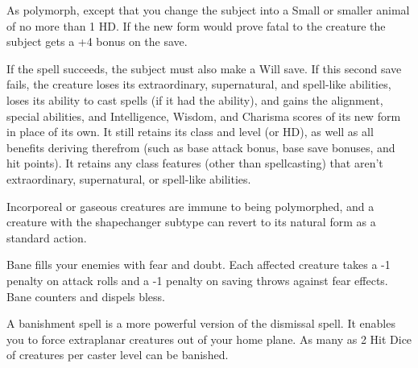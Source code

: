\begin{multicols}{2}
\begin{small}

\noindent As polymorph, except that you change the subject into a Small or smaller animal of no more than 1 HD. If the new form would prove fatal to the creature the subject gets a +4 bonus on the save.

\smallskip\noindent If the spell succeeds, the subject must also make a Will save. If this second save fails, the creature loses its extraordinary, supernatural, and spell-like abilities, loses its ability to cast spells (if it had the ability), and gains the alignment, special abilities, and Intelligence, Wisdom, and Charisma scores of its new form in place of its own. It still retains its class and level (or HD), as well as all benefits deriving therefrom (such as base attack bonus, base save bonuses, and hit points). It retains any class features (other than spellcasting) that aren't extraordinary, supernatural, or spell-like abilities.

\smallskip\noindent Incorporeal or gaseous creatures are immune to being polymorphed, and a creature with the shapechanger subtype can revert to its natural form as a standard action.

\noindent Bane fills your enemies with fear and doubt. Each affected creature takes a -1 penalty on attack rolls and a -1 penalty on saving throws against fear effects. Bane counters and dispels bless.

\noindent A banishment spell is a more powerful version of the dismissal spell. It enables you to force extraplanar creatures out of your home plane. As many as 2 Hit Dice of creatures per caster level can be banished.


\end{small}
\end{multicols}
